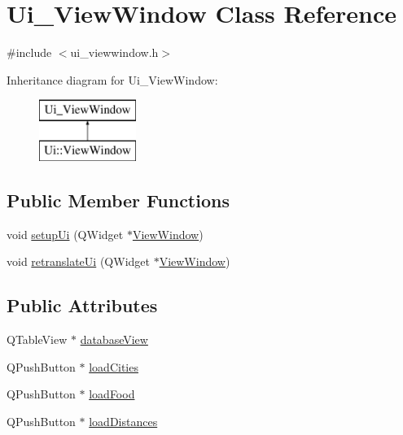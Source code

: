 \hypertarget{class_ui___view_window}{}\section{Ui\+\_\+\+View\+Window Class Reference}
\label{class_ui___view_window}


{\ttfamily \#include $<$ui\+\_\+viewwindow.\+h$>$}

Inheritance diagram for Ui\+\_\+\+View\+Window\+:\begin{figure}[H]
\begin{center}
\leavevmode
\includegraphics[height=2.000000cm]{class_ui___view_window}
\end{center}
\end{figure}
\subsection*{Public Member Functions}
\begin{DoxyCompactItemize}
\item 
void \mbox{\hyperlink{class_ui___view_window_ae518c45a0141518ec16947cbf5eee3fb}{setup\+Ui}} (Q\+Widget $\ast$\mbox{\hyperlink{class_view_window}{View\+Window}})
\item 
void \mbox{\hyperlink{class_ui___view_window_a6f1b9fe6e15e336d2a9821ffbbcc561e}{retranslate\+Ui}} (Q\+Widget $\ast$\mbox{\hyperlink{class_view_window}{View\+Window}})
\end{DoxyCompactItemize}
\subsection*{Public Attributes}
\begin{DoxyCompactItemize}
\item 
Q\+Table\+View $\ast$ \mbox{\hyperlink{class_ui___view_window_ad372b75b3dfd029b0d589c548a2fe15e}{database\+View}}
\item 
Q\+Push\+Button $\ast$ \mbox{\hyperlink{class_ui___view_window_aa1b1460286de8ab1fb41f1e0214f3d9c}{load\+Cities}}
\item 
Q\+Push\+Button $\ast$ \mbox{\hyperlink{class_ui___view_window_a91d5781062444461d115e1ecdb29711c}{load\+Food}}
\item 
Q\+Push\+Button $\ast$ \mbox{\hyperlink{class_ui___view_window_a0a3ce10a8f42310ac3ce36232f731fa7}{load\+Distances}}
\end{DoxyCompactItemize}


